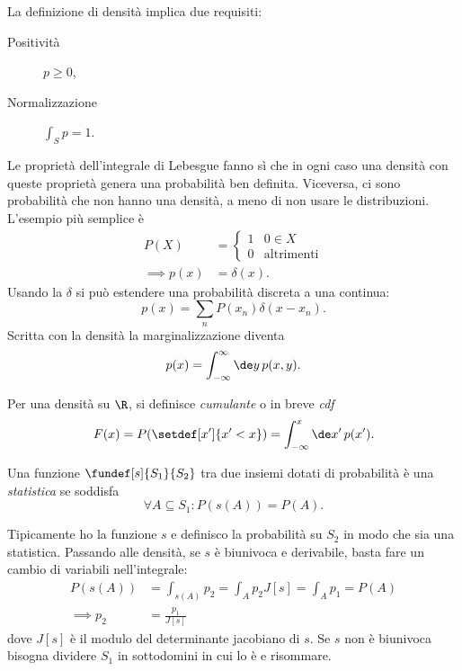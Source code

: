 La definizione di densità implica due requisiti:
\begin{description}
	\item[Positività] $p \ge 0$,
	\item[Normalizzazione] $\int_S p = 1$.
\end{description}
Le proprietà dell'integrale di Lebesgue fanno sì che in ogni caso una densità con queste proprietà genera una probabilità ben definita.
Viceversa, ci sono probabilità che non hanno una densità, a meno di non usare le distribuzioni.
L'esempio più semplice è
\begin{align*}
	P(X) &= \begin{cases}
		1 & 0 \in X \\
		0 & \text{altrimenti}
	\end{cases} \\
	\implies p(x) &= \delta(x).
\end{align*}
Usando la $\delta$ si può estendere una probabilità discreta a una continua:
\begin{equation*}
	p(x) = \sum_n P(x_n)\delta(x-x_n).
\end{equation*}
Scritta con la densità la marginalizzazione diventa
\begin{equation*}
	p(x) = \int_{-\infty}^\infty \de y\,p(x,y).
\end{equation*}

\begin{defn}[Cumulante]
	Per una densità su $\R$, si definisce \emph{cumulante} o in breve \emph{cdf}
	\begin{equation*}
		F(x) = P(\setdef[x']{x'<x}) = \int_{-\infty}^x \de x'\,p(x').
	\end{equation*}
\end{defn}

\begin{defn}[Statistica]
	Una funzione $\fundef[s]{S_1}{S_2}$ tra due insiemi dotati di probabilità è una \emph{statistica} se soddisfa
	\begin{equation*}
		\forall A\subseteq S_1 : P(s(A)) = P(A).
	\end{equation*}
\end{defn}

Tipicamente ho la funzione $s$ e definisco la probabilità su $S_2$ in modo che sia una statistica.
Passando alle densità, se $s$ è biunivoca e derivabile, basta fare un cambio di variabili nell'integrale:
\begin{align*}
	P(s(A)) &= \int_{s(A)} p_2 = \int_A p_2 J[s] = \int_A p_1 = P(A) \\
	\implies p_2 &= \frac{p_1}{J[s]}
\end{align*}
dove $J[s]$ è il modulo del determinante jacobiano di $s$.
Se $s$ non è biunivoca bisogna dividere $S_1$ in sottodomini in cui lo è e risommare.

